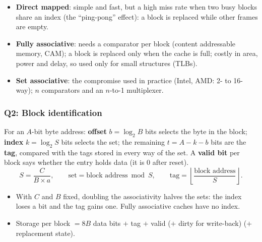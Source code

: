 \begin{itemize}
  \item \textbf{Direct mapped}: simple and fast, but a high miss rate when two
  busy blocks share an index (the ``ping-pong'' effect): a block is replaced while
  other frames are empty.
  \item \textbf{Fully associative}: needs a comparator per block (content
  addressable memory, CAM); a block is replaced only when the cache is full; costly
  in area, power and delay, so used only for small structures (TLBs).
  \item \textbf{Set associative}: the compromise used in practice (Intel, AMD:
  2- to 16-way); $n$ comparators and an $n$-to-1 multiplexer.
\end{itemize}

\subsubsection{Q2: Block identification}
\begin{center}\begin{minipage}{\linewidth}\centering
{}
\end{minipage}
\end{center}
\begin{prop}
For an $A$-bit byte address: \textbf{offset} $b=\log_2 B$ bits selects the byte in
the block; \textbf{index} $k=\log_2 S$ bits selects the set; the remaining
$t=A-k-b$ bits are the \textbf{tag}, compared with the tags stored in every way of
the set. A \textbf{valid bit} per block says whether the entry holds data (it is 0
after reset).
\[
  S=\frac{C}{B\times a},\qquad \text{set}=\text{block address}\bmod S,\qquad
  \text{tag}=\left\lfloor\frac{\text{block address}}{S}\right\rfloor .
\]
\end{prop}
\begin{itemize}
  \item With $C$ and $B$ fixed, doubling the associativity halves the sets: the
  index loses a bit and the tag gains one. Fully associative caches have no index.
  \item Storage per block $=8B$ data bits $+$ tag $+$ valid ($+$ dirty for
  write-back) ($+$ replacement state).
\end{itemize}

